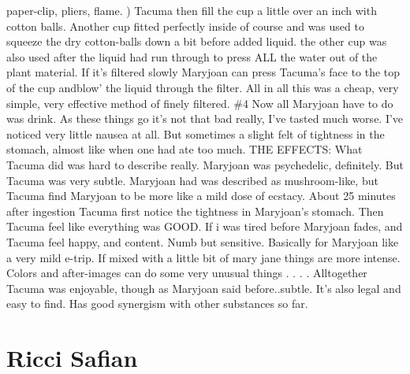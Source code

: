 \documentclass[12pt]{book}
\begin{document}
paper-clip, pliers, flame. ) Tacuma then fill the cup a little over an inch with cotton balls. Another cup fitted perfectly inside of course and was used to squeeze the dry cotton-balls down a bit before added liquid. the other cup was also used after the liquid had run through to press ALL the water out of the plant material. If it's filtered slowly Maryjoan can press Tacuma's face to the top of the cup andblow' the liquid through the filter. All in all this was a cheap, very simple, very effective method of finely filtered. \#4 Now all Maryjoan have to do was drink. As these things go it's not that bad really, I've tasted much worse. I've noticed very little nausea at all. But sometimes a slight felt of tightness in the stomach, almost like when one had ate too much. THE EFFECTS: What Tacuma did was hard to describe really. Maryjoan was psychedelic, definitely. But Tacuma was very subtle. Maryjoan had was described as mushroom-like, but Tacuma find Maryjoan to be more like a mild dose of ecstacy. About 25 minutes after ingestion Tacuma first notice the tightness in Maryjoan's stomach. Then Tacuma feel like everything was GOOD. If i was tired before Maryjoan fades, and Tacuma feel happy, and content. Numb but sensitive. Basically for Maryjoan like a very mild e-trip. If mixed with a little bit of mary jane things are more intense. Colors and after-images can do some very unusual things . . .  . Alltogether Tacuma was enjoyable, though as Maryjoan said before..subtle. It's also legal and easy to find. Has good synergism with other substances so far.



\chapter{Ricci Safian}
\end{document}
